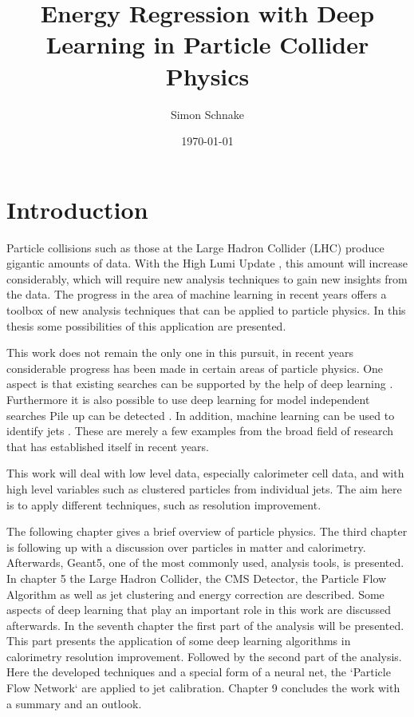 \documentclass[12pt, a4paper]{thesis}
\author{Simon Schnake}
\date{\today}
\title{Energy Regression with Deep Learning in Particle Collider Physics}
\begin{document}


\tableofcontents
\cleardoublepage

\chapter{Introduction}
\label{sec:org1373fac}

Particle collisions such as those at the Large Hadron Collider (LHC)
\cite{lhc_machine} produce gigantic amounts of data. With the High
Lumi Update \cite{bruening19_high_lumin_large_hadron_collid}, this
amount will increase considerably, which will require new analysis
techniques to gain new insights from the data. The progress in the
area of machine learning in recent years offers a toolbox of new
analysis techniques that can be applied to particle physics. In this
thesis some possibilities of this application are presented.

This work does not remain the only one in this pursuit, in recent
years considerable progress has been made in certain areas of particle
physics. One aspect is that existing searches can be supported by the
help of deep learning
\cite{baldi14_searc_exotic_partic_high_energ,baldi15_enhan_higgs_boson_to_with_deep_learn,santos17_machin_learn_techn_searc_decay_chann}.
Furthermore it is also possible to use deep learning for model
independent searches
\cite{dagnolo19_learn_new_physic_from_machin,simone19_guidin_new_physic_searc_with_unsup_learn,heimel19_qcd_or_what}
Pile up can be detected
\cite{komiske17_pileup_mitig_with_machin_learn_pumml}.  In addition,
machine learning can be used to identify jets
\cite{komiske19_energ_flow_networ,cogan15_jet_images,oliveira16_jet_images_deep_learn_edition,baldi16_jet_subst_class_high_energ,barnard17_parton_shower_uncer_jet_subst,kasieczka17_deep_learn_top_tagger_or_end_qcd,datta17_how_much_infor_is_jet,komiske17_deep_learn_color}.
These are merely a few examples from the broad field of research that
has established itself in recent years.

This work will deal with low level data, especially calorimeter cell data, and
with high level variables such as clustered particles from individual jets.  The
aim here is to apply different techniques, such as resolution improvement.

The following chapter gives a brief overview of particle physics. The
third chapter is following up with a discussion over particles in
matter and calorimetry. Afterwards, Geant5, one of the most commonly
used, analysis tools, is presented. In chapter 5 the Large Hadron
Collider, the CMS Detector, the Particle Flow Algorithm as well as jet
clustering and energy correction are described. Some aspects of deep
learning that play an important role in this work are discussed
afterwards. In the seventh chapter the first part of the analysis will
be presented. This part presents the application of some deep learning
algorithms in calorimetry resolution improvement. Followed by the
second part of the analysis. Here the developed techniques and a
special form of a neural net, the `Particle Flow Network` are applied
to jet calibration. Chapter 9 concludes the work with a summary and an
outlook.
\end{document}
